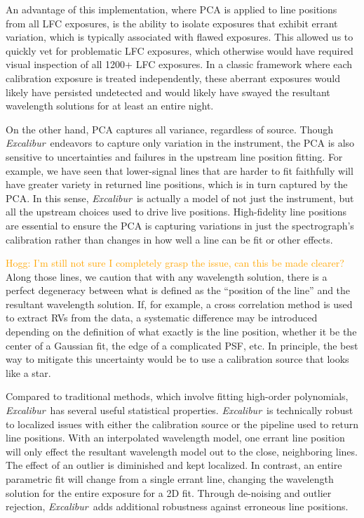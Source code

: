 \documentclass[modern]{aastex63}
\newcommand{\project}[1]{\textsl{#1}}
\newcommand{\name}{\project{Excalibur}}
\newcommand{\lz}[1]{\textcolor{orange}{#1}}
\begin{document}
An advantage of this implementation, where PCA is applied to line positions from all LFC exposures, is the ability to isolate exposures that exhibit errant variation, which is typically associated with flawed exposures.  This allowed us to quickly vet for problematic LFC exposures, which otherwise would have required visual inspection of all 1200+ LFC exposures.  In a classic framework where each calibration exposure is treated independently, these aberrant exposures would likely have persisted undetected and would likely have swayed the resultant wavelength solutions for at least an entire night.

On the other hand, PCA captures all variance, regardless of source.  Though \name\ endeavors to capture only variation in the instrument, the PCA is also sensitive to uncertainties and failures in the upstream line position fitting.  For example, we have seen that lower-signal lines that are harder to fit faithfully will have greater variety in returned line positions, which is in turn captured by the PCA.  In this sense, \name\ is actually a model of not just the instrument, but all the upstream choices used to drive live positions.  High-fidelity line positions are essential to ensure the PCA is capturing variations in just the spectrograph's calibration rather than changes in how well a line can be fit or other effects.

\lz{Hogg: I'm still not sure I completely grasp the issue, can this be made clearer?}
Along those lines, we caution that with any wavelength solution, there is a perfect degeneracy between what is defined as the ``position of the line'' and the resultant wavelength solution.  If, for example, a cross correlation method is used to extract RVs from the data, a systematic difference may be introduced depending on the definition of what exactly is the line position, whether it be the center of a Gaussian fit, the edge of a complicated PSF, etc.  In principle, the best way to mitigate this uncertainty would be to use a calibration source that looks like a star.

Compared to traditional methods, which involve fitting high-order polynomials, \name\ has several useful statistical properties.  \name\ is technically robust to localized issues with either the calibration source or the pipeline used to return line positions.  With an interpolated wavelength model, one errant line position will only effect the resultant wavelength model out to the close, neighboring lines.  The effect of an outlier is diminished and kept localized.  In contrast, an entire parametric fit will change from a single errant line, changing the wavelength solution for the entire exposure for a 2D fit.  Through de-noising and outlier rejection, \name\ adds additional robustness against erroneous line positions.
\end{document}
